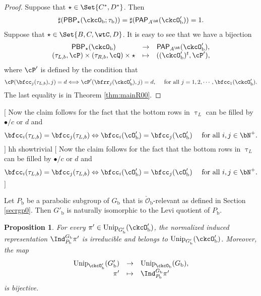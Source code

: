 \documentclass[12pt]{amsart}
\newcommand{\trivial}[2][]{\if\relax\detokenize{#1}\relax
  {%
      \color{orange} \vspace{0em}$[$#2$]$
      \color{black}
  }
  \else
\ifx#1h
\ifcsname showtrivial\endcsname
{%
    \color{orange}\vspace{0em}$[$#2$]$
    \color{black}
}
\fi
\else {\red Wrong argument!} \fi
\fi
}
\newcommand{\CO}{{\mathcal {O}}}
\newcommand{\be}{\begin {equation}}
\newcommand{\ee}{\end {equation}}
\numberwithin{equation}{section}
\newtheorem{prop}[thm]{Proposition}
\theoremstyle{remark}
\def\Unip{\mathrm{Unip}}
\def\PP{\mathsf{PAP}}
\def\PBP{\mathsf{PBP}}
\def\ckcOb{\ckcO_{\mathrm b}}
\def\ckcOpb{\ckcO'_{\mathrm b}}
\def\cOpb{\cO'_{\mathrm b}}
\def\Gb{G_{\mathrm b}}
\def\Gpb{G'_{\mathrm b}}
\def\Pb{P_{\mathrm b}}
\begin{document}
\begin{proof} Suppose that $\star \in \Set{C^{*},D^{*}}$. Then
\[
    \begin{split}
      \sharp(\PBP_{\star}(\ckcO_{\mathrm b};\tau_{\mathrm b}))= \sharp(\PP_{A^{\bH}}(\ckcO'_{\mathrm b}))= 1.
    \end{split}
\]
  Suppose that $\star \in \Set{B,C,\wtC,D}$.
   It is easy to see that we have a bijection
  \[
    \begin{array}{ccc}
      \PBP_{\star}(\ckcO_{\mathrm b}) &  \rightarrow & \PP_{A^{\bR}}(\ckcO'_{\mathrm b}),\\
      (\tau_{L,b},\cP)\times (\tau_{R,b},\cQ)\times \star & \mapsto & ((\ckcO'_{\mathrm b})^t,\cP'),
    \end{array}
  \]
  where $\cP'$ is defined by the condition that
  \[
    \cP(\bfcc_{j}(\tau_{L,b}),j)=d \Longleftrightarrow \cP'(\bfrr_{j}(\ckcO'_{\mathrm b}),j)=d, \quad \textrm{ for all } j=1,2,\cdots, \bfcc_{1}(\ckcO'_{\mathrm b}).
  \]
  The last equality is in Theorem \ref{thm:mainR00}.   \end{proof}


  \trivial[h]{
    Now the claim follows for the fact that the bottom rows in $\uptau_{L}$ can
    be filled by $\bullet/c$ or $d$ and
    \[
      \bfcc_{i}(\tau_{L,b}) = \bfcc_{j}(\tau_{L,b}) \Leftrightarrow \bfcc_{i}(\cOpb) = \bfcc_{j}(\cOpb) \quad \textrm{ for all } i,j\in \bN^{+}.
    \]
  }



Let $P_{\mathrm b}$ be a parabolic subgroup of $G_{\mathrm b}$ that is  $\check \CO_\mathrm b$-relevant as defined in Section \ref{secrgp0}. Then
  $G'_{\mathrm b}$ is naturally isomorphic to the Levi quotient of $P_\mathrm b$.


\def\fIb{\fI_{\mathrm b}}
\def\pib{\pi_{\mathrm b}}


\begin{prop}\label{lem:Unip.BP}
For every $\pi'\in \Unip_{\Gpb}(\ckcOpb)$, the normalized induced representation
$\Ind_{\Pb}^{\Gb}\pi'$ is irreducible and belongs to $\Unip_{\Gpb}(\ckcOpb)$.
Moreover, the map
  \be\label{badind}
    \begin{array}{rcl}
      \Unip_{\ckcO'_{\mathrm b}}(G'_{\mathrm b}) & \rightarrow & \Unip_{\ckcOb}(\Gb), \\
      \pi' & \mapsto & %
                        \Ind_{\Pb}^{\Gb}\pi'
    \end{array}
  \ee
  is bijective.
\end{prop}
\end{document}
